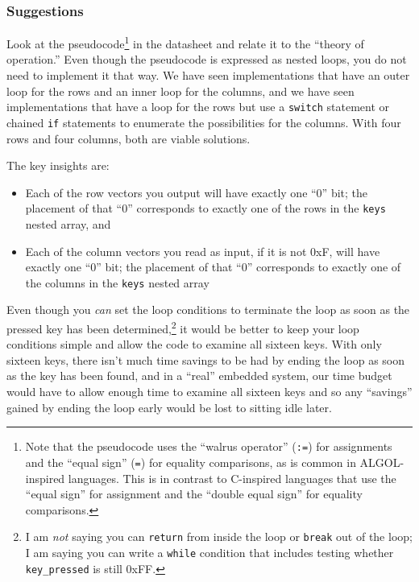 \subsubsection*{Suggestions}
Look at the pseudocode\footnote{
    Note that the pseudocode uses the ``walrus operator'' (\texttt{:=}) for assignments and the ``equal sign'' (\texttt{=}) for equality comparisons, as is common in ALGOL-inspired languages.
    This is in contrast to C-inspired languages that use the ``equal sign'' for assignment and the ``double equal sign'' for equality comparisons.
} in the datasheet and relate it to the ``theory of operation.''
Even though the pseudocode is expressed as nested loops, you do not need to implement it that way.
We have seen implementations that have an outer loop for the rows and an inner loop for the columns,
and we have seen implementations that have a loop for the rows but use a \lstinline{switch} statement or chained \lstinline{if} statements to enumerate the possibilities for the columns.
With four rows and four columns, both are viable solutions.

The key insights are:
\begin{itemize}
    \item Each of the row vectors you output will have exactly one ``0'' bit;
        the placement of that ``0'' corresponds to exactly one of the rows in the \lstinline{keys} nested array, and
    \item Each of the column vectors you read as input, if it is not 0xF, will have exactly one ``0'' bit;
        the placement of that ``0'' corresponds to exactly one of the columns in the \lstinline{keys} nested array
\end{itemize}

Even though you \textit{can} set the loop conditions to terminate the loop as soon as the pressed key has been determined,\footnote{
    I am \textit{not} saying you can \lstinline{return} from inside the loop or \lstinline{break} out of the loop;
    I am saying you can write a \lstinline{while} condition that includes testing whether \lstinline{key_pressed} is still 0xFF.
} it would be better to keep your loop conditions simple and allow the code to examine all sixteen keys.
With only sixteen keys, there isn't much time savings to be had by ending the loop as soon as the key has been found,
and in a ``real'' embedded system, our time budget would have to allow enough time to examine all sixteen keys and so any ``savings'' gained by ending the loop early would be lost to sitting idle later.

